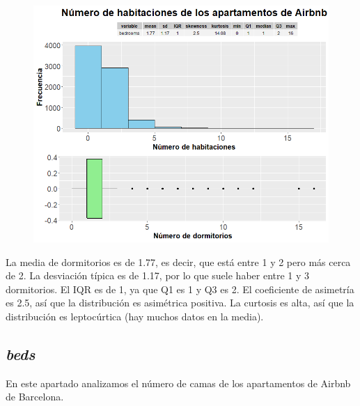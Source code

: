 \documentclass{article}
\begin{document}
\vspace{0.35cm}
\begin{figure}[h]
\hspace*{-0.15cm}
\centering
\includegraphics[scale = 0.6]{grafico_bedrooms}
\end{figure}
\vspace{0.15cm}

La media de dormitorios es de 1.77, es decir, que está entre 1 y 2 pero más cerca de 2.
La desviación típica es de 1.17, por lo que suele haber entre 1 y 3 dormitorios.
El IQR es de 1, ya que Q1 es 1 y Q3 es 2.
El coeficiente de asimetría es 2.5, así que la distribución es asimétrica positiva.
La curtosis es alta, así que la distribución es leptocúrtica (hay muchos datos en la media).

\clearpage
\subsection{\emph{beds}}
En este apartado analizamos el número de camas de los apartamentos de Airbnb de Barcelona.
\end{document}

